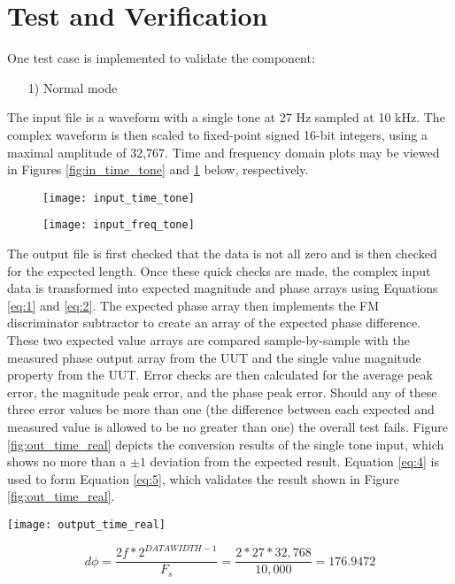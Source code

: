 \section*{Test and Verification}
	One test case is implemented to validate the \Comp{} component:
	\begin{itemize}
		\item[1)] Normal mode
	\end{itemize}
	The input file is a waveform with a single tone at 27 Hz sampled at 10 kHz. The complex waveform is then scaled to fixed-point signed 16-bit integers, using a maximal amplitude of 32,767. Time and frequency domain plots may be viewed in Figures \ref{fig:in_time_tone} and \ref{fig:in_freq_tone} below, respectively.\par\medskip
	\begin{figure}[ht]
	\centering
	\begin{minipage}{.5\textwidth}
		\centering\texttt{[image: input\_time\_tone]}
		\label{fig:in_time_tone}
	\end{minipage}%
	\begin{minipage}{.5\textwidth}
		\centering\texttt{[image: input\_freq\_tone]}
		\label{fig:in_freq_tone}
	\end{minipage}
\end{figure}
	\noindent The output file is first checked that the data is not all zero and is then checked for the expected length. Once these quick checks are made, the complex input data is transformed into expected magnitude and phase arrays using Equations \ref{eq:1} and \ref{eq:2}. The expected phase array then implements the FM discriminator subtractor to create an array of the expected phase difference. These two expected value arrays are compared sample-by-sample with the measured phase output array from the UUT and the single value magnitude property from the UUT. Error checks are then calculated for the average peak error, the magnitude peak error, and the phase peak error. Should any of these three error values be more than one (the difference between each expected and measured value is allowed to be no greater than one) the overall test fails. Figure \ref{fig:out_time_real} depicts the conversion results of the single tone input, which shows no more than a $\pm1$ deviation from the expected result. Equation \ref{eq:4} is used to form Equation \ref{eq:5}, which validates the result shown in Figure \ref{fig:out_time_real}.

{\centering\captionsetup{type=figure}\texttt{[image: output\_time\_real]}\par{}\label{fig:out_time_real}}

\begin{equation} \label{eq:5}
	d\phi = \frac{2f*2^{DATAWIDTH-1}}{F_s} = \frac{2*27*32,768}{10,000} = 176.9472
\end{equation}

